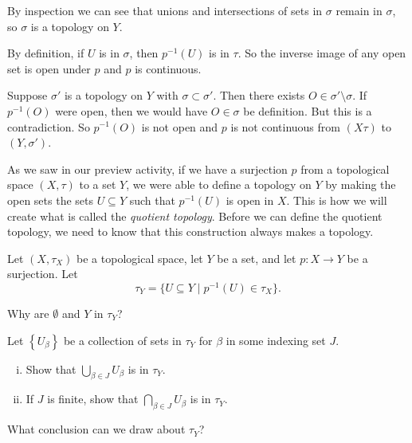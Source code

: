 \item By inspection we can see that unions and intersections of sets in $\sigma$ remain in $\sigma$, so $\sigma$ is a topology on $Y$.  

\item By definition, if $U$ is in $\sigma$, then $p^{-1}(U)$ is in $\tau$. So the inverse image of any open set is open under $p$ and $p$ is continuous.

\item Suppose $\sigma'$ is a topology on $Y$ with $\sigma \subset \sigma'$. Then there exists $O \in \sigma' \setminus \sigma$. If $p^{-1}(O)$ were open, then we would have $O \in \sigma$ be definition. But this is a contradiction. So $p^{-1}(O)$ is not open and $p$ is not continuous from $(X \tau)$ to $(Y, \sigma')$. 

\ea



As we saw in our preview activity, if we have a surjection $p$ from a topological space $(X,\tau)$ to a set $Y$, we were able to define a topology on $Y$ by making the open sets the sets $U \subseteq Y$ such that $p^{-1}(U)$ is open in $X$. This is how we will create what is called the \emph{quotient topology}.  Before we can define the quotient topology, we need to know that this construction always makes a topology.

\begin{activity} \label{act:quot_topology} Let $(X,\tau_X)$ be a topological space, let $Y$ be a set, and let $p: X \to Y$ be a surjection. Let 
\[\tau_Y = \{U \subseteq Y \mid p^{-1}(U) \in \tau_X\}.\]
\ba
\item Why are $\emptyset$ and $Y$ in $\tau_Y$?

\item Let $\left\{U_{\beta}\right\}$ be a collection of sets in $\tau_Y$ for $\beta$ in some indexing set $J$. 
	\begin{enumerate}[i.]
	\item Show that $\bigcup_{\beta \in J} U_{\beta}$ is in $\tau_Y$.
	
	\item If $J$ is finite, show that $\bigcap_{\beta \in J} U_{\beta}$ is in $\tau_Y$.
	
	\end{enumerate}
	
\item What conclusion can we draw about $\tau_Y$? 

\ea

\end{activity}

